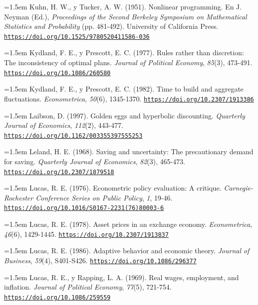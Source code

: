 \documentclass[10pt,a4paper]{article}
\begin{document}
\noindent\hangindent=1.5em Kuhn, H. W., y Tucker, A. W. (1951). Nonlinear programming. En J. Neyman (Ed.), \textit{Proceedings of the Second Berkeley Symposium on Mathematical Statistics and Probability} (pp. 481-492). University of California Press. \href{https://doi.org/10.1525/9780520411586-036}{\nolinkurl{https://doi.org/10.1525/9780520411586-036}}

\noindent\hangindent=1.5em Kydland, F. E., y Prescott, E. C. (1977). Rules rather than discretion: The inconsistency of optimal plans. \textit{Journal of Political Economy}, \textit{85}(3), 473-491. \href{https://doi.org/10.1086/260580}{\nolinkurl{https://doi.org/10.1086/260580}}

\noindent\hangindent=1.5em Kydland, F. E., y Prescott, E. C. (1982). Time to build and aggregate fluctuations. \textit{Econometrica}, \textit{50}(6), 1345-1370. \href{https://doi.org/10.2307/1913386}{\nolinkurl{https://doi.org/10.2307/1913386}}

\noindent\hangindent=1.5em Laibson, D. (1997). Golden eggs and hyperbolic discounting. \textit{Quarterly Journal of Economics}, \textit{112}(2), 443-477. \href{https://doi.org/10.1162/003355397555253}{\nolinkurl{https://doi.org/10.1162/003355397555253}}

\noindent\hangindent=1.5em Leland, H. E. (1968). Saving and uncertainty: The precautionary demand for saving. \textit{Quarterly Journal of Economics}, \textit{82}(3), 465-473. \href{https://doi.org/10.2307/1879518}{\nolinkurl{https://doi.org/10.2307/1879518}}

\noindent\hangindent=1.5em Lucas, R. E. (1976). Econometric policy evaluation: A critique. \textit{Carnegie-Rochester Conference Series on Public Policy}, \textit{1}, 19-46. \href{https://doi.org/10.1016/S0167-2231(76)80003-6}{\nolinkurl{https://doi.org/10.1016/S0167-2231(76)80003-6}}

\noindent\hangindent=1.5em Lucas, R. E. (1978). Asset prices in an exchange economy. \textit{Econometrica}, \textit{46}(6), 1429-1445. \href{https://doi.org/10.2307/1913837}{\nolinkurl{https://doi.org/10.2307/1913837}}

\noindent\hangindent=1.5em Lucas, R. E. (1986). Adaptive behavior and economic theory. \textit{Journal of Business}, \textit{59}(4), S401-S426. \href{https://doi.org/10.1086/296377}{\nolinkurl{https://doi.org/10.1086/296377}}

\noindent\hangindent=1.5em Lucas, R. E., y Rapping, L. A. (1969). Real wages, employment, and inflation. \textit{Journal of Political Economy}, \textit{77}(5), 721-754. \href{https://doi.org/10.1086/259559}{\nolinkurl{https://doi.org/10.1086/259559}}
\end{document}
